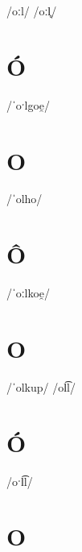 \documentclass[10pt,a4paper,twoside]{book}
\begin{document}
\begin{multicols}{3}
 {/oːl/} {}
 {/oːl̥/} {}
\end{multicols}

\section*{Ó}

\begin{multicols}{3}
 {/ˈoˑlgoe̯/} {}
\end{multicols}

\section*{O}

\begin{multicols}{3}
 {/ˈolho/} {}
\end{multicols}

\section*{Ô}

\begin{multicols}{3}
 {/ˈoːlkoe̯/} {}
\end{multicols}

\section*{O}

\begin{multicols}{3}
 {/ˈolkup/} {}
 {/ol͡l/} {}
\end{multicols}

\section*{Ó}

\begin{multicols}{3}
 {/oˑl͡l/} {}
\end{multicols}

\section*{O}
\end{document}
